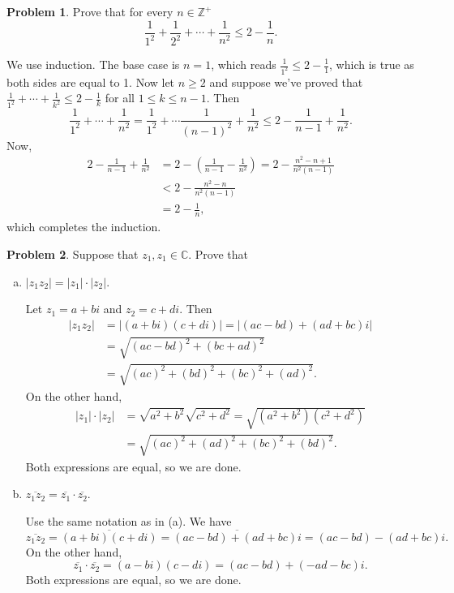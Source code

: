 \documentclass[11pt,oneside]{amsart}
\theoremstyle{definition}
\newtheorem{problem}{Problem}
\newcommand{\bC}{\mathbb{C}}
\newcommand{\bZ}{\mathbb{Z}}
\begin{document}
    \begin{problem}
        Prove that for every $n\in\bZ^+$
        \[\frac 1{1^2}+\frac 1{2^2}+\cdots+\frac 1{n^2}\leq 2-\frac 1n.\]
    \end{problem}
    \begin{solution}
        We use induction. The base case is $n=1$, which reads $\frac 1{1^2}\leq 2-\frac 11$, which is true as both sides are equal to 1. Now let $n\geq 2$ and suppose we've proved that $\frac 1{1^2}+\cdots+\frac 1{k^2}\leq 2-\frac 1k$ for all $1\leq k\leq n-1$. Then
        \[\frac 1{1^2}+\cdots+\frac 1{n^2}=\frac 1{1^2}+\cdots\frac 1{(n-1)^2}+\frac 1{n^2}\leq 2-\frac 1{n-1}+\frac 1{n^2}.\]
        Now,
        \[\begin{split}
            2-\frac 1{n-1}+\frac 1{n^2}&=2-\left(\frac 1{n-1}-\frac 1{n^2}\right)=2-\frac{n^2-n+1}{n^2(n-1)}\\
            &<2-\frac{n^2-n}{n^2(n-1)} \\
            &= 2-\frac 1n,
        \end{split}\]
        which completes the induction.
    \end{solution}

    \begin{problem}
        Suppose that $z_1,z_1\in\bC$. Prove that
        \begin{enumerate}[(a)]
            \item $|z_1z_2|=|z_1|\cdot|z_2|$.
            \begin{solution}
                Let $z_1=a+bi$ and $z_2=c+di$. Then
                \[\begin{split}
                    |z_1z_2| &= |(a+bi)(c+di)| = |(ac-bd)+(ad+bc)i|\\
                    &=\sqrt{(ac-bd)^2+(bc+ad)^2}\\
                    &= \sqrt{(ac)^2+(bd)^2+(bc)^2+(ad)^2}.
                \end{split}\]
                On the other hand,
                \[\begin{split}
                    |z_1|\cdot|z_2|&=\sqrt{a^2+b^2}\sqrt{c^2+d^2}=\sqrt{(a^2+b^2)(c^2+d^2)}\\
                    &= \sqrt{(ac)^2+(ad)^2+(bc)^2+(bd)^2}.
                \end{split}\]
                Both expressions are equal, so we are done.
            \end{solution}
            \item $\overline{z_1z_2}=\overline{z_1}\cdot\overline{z_2}$.
            \begin{solution}
                Use the same notation as in (a). We have
                \[\overline{z_1z_2}=\overline{(a+bi)(c+di)}=\overline{(ac-bd)+(ad+bc)i}=(ac-bd)-(ad+bc)i.\]
                On the other hand,
                \[\overline{z_1}\cdot\overline{z_2}=(a-bi)(c-di)=(ac-bd)+(-ad-bc)i.\]
                Both expressions are equal, so we are done.
            \end{solution}
        \end{enumerate}
    \end{problem}
\end{document}
